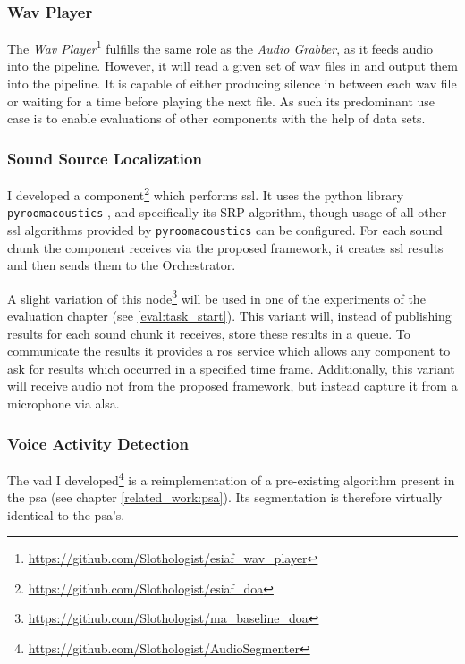 \subsubsection{Wav Player}
\label{main:components:wav}
The \textit{Wav Player}\footnote{\url{https://github.com/Slothologist/esiaf_wav_player}} fulfills the same role as the \textit{Audio Grabber}, as it feeds audio into the pipeline.
However, it will read a given set of wav files in and output them into the pipeline.
It is capable of either producing silence in between each wav file or waiting for a time before playing the next file.
As such its predominant use case is to enable evaluations of other components with the help of data sets.

\subsubsection{Sound Source Localization}
\label{main:components:ssl}
I developed a component\footnote{\url{https://github.com/Slothologist/esiaf_doa}} which performs \gls{ssl}.
It uses the python library \texttt{pyroomacoustics} \cite{pyroomacoustics}, and specifically its SRP algorithm, though usage of all other \gls{ssl} algorithms provided by \texttt{pyroomacoustics} can be configured.
For each sound chunk the component receives via the proposed framework, it creates \gls{ssl} results and then sends them to the Orchestrator.

A slight variation of this node\footnote{\url{https://github.com/Slothologist/ma_baseline_doa}}  will be used in one of the experiments of the evaluation chapter (see \ref{eval:task_start}).
This variant will, instead of publishing results for each sound chunk it receives, store these results in a queue.
To communicate the results it provides a \gls{ros} service which allows any component to ask for results which occurred in a specified time frame.
Additionally, this variant will receive audio not from the proposed framework, but instead capture it from a microphone via \gls{alsa}.

\subsubsection{Voice Activity Detection}
\label{main:components:vad}
The \gls{vad} I developed\footnote{\url{https://github.com/Slothologist/AudioSegmenter}} is a reimplementation of a pre-existing algorithm present in the \gls{psa} (see chapter \ref{related_work:psa}).
Its segmentation is therefore virtually identical to the \gls{psa}'s.

